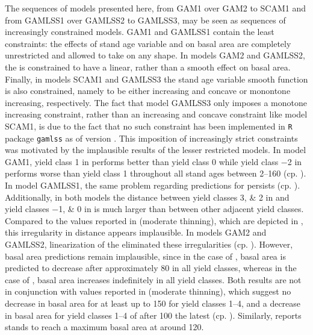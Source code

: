 The sequences of models presented here, from GAM1 over GAM2 to SCAM1 and from GAMLSS1 over GAMLSS2 to GAMLSS3, may be seen as sequences of increasingly constrained models.  GAM1 and GAMLSS1 contain the least constraints:  the effects of stand age variable and \ProductivityIndexVariableText{} on basal area are completely unrestricted and allowed to take on any shape.  In models GAM2 and GAMLSS2, the \ProductivityIndexVariableText{} is constrained to have a linear, rather than a smooth effect on basal area.  Finally, in models SCAM1 and GAMLSS3 the stand age variable smooth function is also constrained, namely to be either increasing and concave or monontone increasing, respectively.  The fact that model GAMLSS3 only imposes a monotone increasing constraint, rather than an increasing and concave constraint like model SCAM1, is due to the fact that no such constraint has been implemented in \texttt{R} package \texttt{gamlss} as of version \gamlssPackageVersion{}.
This imposition of increasingly strict constraints was motivated by the implausible results of the lesser restricted models.
In model GAM1, yield class \num{1} in \Beech{} performs better than yield class \num{0} while
yield class \num{-2} in \Spruce{} performs worse than yield class \num{1} throughout all stand ages between \SIrange{2}{160}{\year} (cp. ).
In model GAMLSS1, the same problem regarding predictions for \Beech{} persists (cp. ).  Additionally, in both models the distance between yield classes \numlist{3;2} in \Beech{} and yield classes \numlist{-1;0} in \Spruce{} is much larger than between other adjacent yield classes.  Compared to the values reported in \textcite{Schober1995} (moderate thinning), which are depicted in , this irregularity in distance appears implausible.
In models GAM2 and GAMLSS2, linearization of the \ProductivityIndexVariableText{} eliminated these irregularities (cp. ).  However, basal area predictions remain implausible, since in the case of \Beech{}, basal area is predicted to decrease after approximately \SI{80}{\year} in all yield classes, whereas in the case of \Spruce{}, basal area increases indefinitely in all yield classes.  Both results are not in conjunction with values reported in \textcite{Schober1995} (moderate thinning), which suggest no decrease in basal area for \Beech{} at least up to \SI{150}{\year} for yield classes \numrange{1}{4}, and a decrease in basal area for yield classes \numrange{1}{4} of \Spruce{} after \SI{100}{\year} the latest (cp. ).  Similarly, \textcite{Franz1965} reports \Spruce{} stands to reach a maximum basal area at around \SI{120}{\year}.
